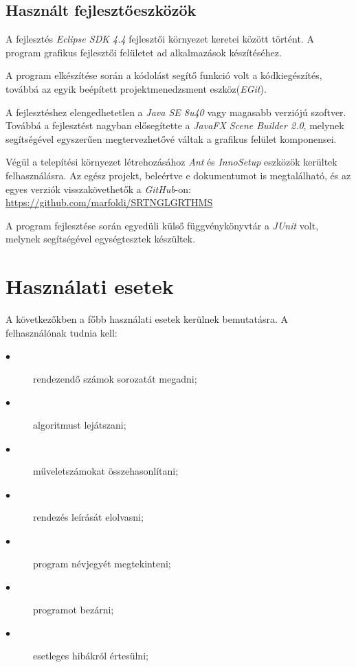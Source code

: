 \documentclass{elteikthesis}
\begin{document}
\subsection{Használt fejlesztőeszközök}
A fejlesztés \emph{Eclipse SDK 4.4} fejlesztői környezet keretei között történt. A program grafikus fejlesztői felületet ad alkalmazások készítéséhez.\par
A program elkészítése során a kódolást segítő funkció volt a kódkiegészítés, továbbá az egyik beépített projektmenedzsment eszköz(\emph{EGit}).\par
A fejlesztéshez elengedhetetlen a \emph{Java SE 8u40} vagy magasabb verziójú szoftver. Továbbá a fejlesztést nagyban elősegítette a \emph{JavaFX Scene Builder 2.0}, melynek segítségével egyszerűen megtervezhetővé váltak a grafikus felület komponensei.\par
Végül a telepítési környezet létrehozásához \emph{Ant} és \emph{InnoSetup} eszközök kerültek felhasználásra.
Az egész projekt, beleértve e dokumentumot is megtalálható, és az egyes verziók visszakövethetők a \emph{GitHub}-on: \url{https://github.com/marfoldi/SRTNGLGRTHMS}\par
A program fejlesztése során egyedüli külső függvénykönyvtár a \emph{JUnit} volt, melynek segítségével egységtesztek készültek.

\section{Használati esetek}
A következőkben a főbb használati esetek kerülnek bemutatásra. A felhasználónak tudnia kell:\par
\begin{description}
	\item[$\bullet$] rendezendő számok sorozatát megadni;
	\item[$\bullet$] algoritmust lejátszani;
	\item[$\bullet$] műveletszámokat összehasonlítani;
	\item[$\bullet$] rendezés leírását elolvasni;
	\item[$\bullet$] program névjegyét megtekinteni;
	\item[$\bullet$] programot bezárni;
	\item[$\bullet$] esetleges hibákról értesülni;
\end{description}
\end{document}
